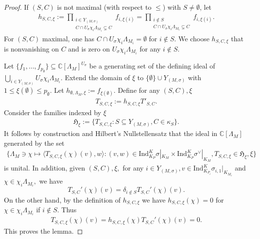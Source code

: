 \documentclass[10pt,a4paper]{amsart}
\newcommand{\CC}{\mathbb{C}}
\begin{document}
\begin{proof}
    
    If $(S,C)$ is not maximal (with respect to $\leq$) with $S\neq\emptyset$, let
    \begin{align*}
        h_{S,C,\xi}:=\prod_{\substack{i\in Y_{(M,\sigma)}\\ C\cap U_\sigma \chi_i\Lambda_{M_i}\subsetneq C}}f_{i,\xi(i)}=\prod_{\substack{i\notin S\\ C\cap U_\sigma \chi_i\Lambda_{M_i}\subsetneq C}} f_{i,\xi(i)}.
    \end{align*}
    For $(S,C)$ maximal, one has $C\cap U_\sigma\chi_i\Lambda_{M_i} = \emptyset$ for $i\not\in S$. We choose $h_{S,C,\xi}$ that is nonvanishing on $C$ and is zero on $U_\sigma\chi_i\Lambda_{M_i}$ for any $i\not\in S.$ 
    
    Let $\{f_{1},\ldots,f_{p_\emptyset}\}\subseteq \CC[\Lambda_M]^{U_\sigma}$ be a generating set of the defining ideal of $\bigcup_{i\in Y_{(M,\sigma)}}U_\sigma \chi_i\Lambda_{M_i}.$ Extend the domain of $\xi$ to  $\{\emptyset\} \cup Y_{(M,\sigma)}$ with $1\le \xi(\emptyset)\le p_{\emptyset}.$ Let $h_{\emptyset,\Lambda_M,\xi}:=f_{\xi(\emptyset)}.$ Define for any $(S,C),\xi$
    \begin{align*}
       T_{S,C,\xi}:=h_{S,C,\xi}T'_{S,C}.
    \end{align*}
     Consider the families indexed by $\xi$
    \begin{align*}
        \mathfrak{H}_{\xi}:=\{ T_{S,C,\xi}: S\subseteq Y_{(M,\sigma)}, C\in \kappa_S\}.
    \end{align*}
    It follows by construction and Hilbert's Nullstellensatz that the ideal in $\CC[\Lambda_M]$ generated by the set 
    \begin{align*}
        \{\Lambda_{M}\ni \chi \mapsto \langle T_{S,C,\xi}(\chi)(v),w \rangle: (v,w)\in \mathrm{Ind}_{K_{P}}^K \sigma|_{K_M}\times \mathrm{Ind}_{K_{P}}^K \sigma^\lor|_{K_M}, T_{S,C,\xi}\in \mathfrak{H}_\xi, \xi\}
    \end{align*}
    is unital. In addition, given $(S,C),\xi,$ for any $i\in Y_{(M,\sigma)}, v\in \mathrm{Ind}_{K_{P_i}}^K \sigma_{i,1}|_{K_{M_i}}$ and $\chi\in \chi_i\Lambda_{M_i},$ we have $$T_{S,C}'(\chi)(v)=\delta_{i\notin S}T_{S,C}'(\chi)(v).$$
     On the other hand, by the definition of $h_{S,C,\xi}$ we have  $h_{S,C,\xi}(\chi)=0$ for $\chi\in \chi_i\Lambda_{M_i}$ if $i\not\in S$. Thus 
    \begin{align*}
    T_{S,C,\xi}(\chi)(v)=h_{S,C,\xi}(\chi)T_{S,C}'(\chi)(v)=0.
    \end{align*}
    This proves the lemma.
\end{proof}
\end{document}
